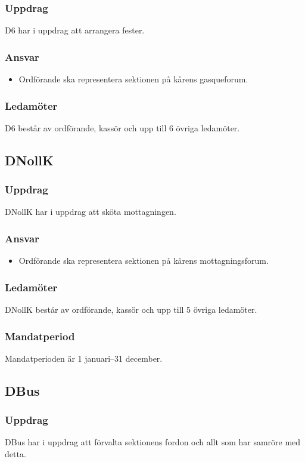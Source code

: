 \subsubsection{Uppdrag}
D6 har i uppdrag att arrangera fester.
\subsubsection{Ansvar}
\begin{itemize}
    \item Ordförande ska representera sektionen på kårens gasqueforum.
\end{itemize}
\subsubsection{Ledamöter}
D6 består av ordförande, kassör och upp till 6 övriga ledamöter.

\subsection{DNollK}
\subsubsection{Uppdrag}
DNollK har i uppdrag att sköta mottagningen.
\subsubsection{Ansvar}
\begin{itemize}
    \item Ordförande ska representera sektionen på kårens mottagningsforum.
\end{itemize}
\subsubsection{Ledamöter}
DNollK består av ordförande, kassör och upp till 5 övriga ledamöter.
\subsubsection{Mandatperiod}
Mandatperioden är 1 januari--31 december.

\subsection{DBus}
\subsubsection{Uppdrag}
DBus har i uppdrag att förvalta sektionens fordon och allt som har samröre med detta.
